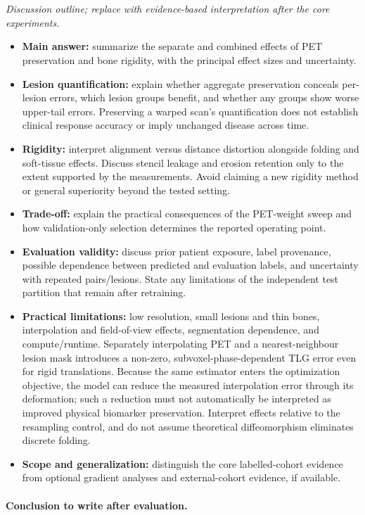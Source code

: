 \section{}
\begin{journaladdition}
\noindent\textit{Discussion outline; replace with evidence-based interpretation after the core experiments.}
\begin{itemize}
  \item \textbf{Main answer:} summarize the separate and combined effects of PET preservation and bone rigidity, with the principal effect sizes and uncertainty.
  \item \textbf{Lesion quantification:} explain whether aggregate preservation conceals per-lesion errors, which lesion groups benefit, and whether any groups show worse upper-tail errors. Preserving a warped scan's quantification does not establish clinical response accuracy or imply unchanged disease across time.
  \item \textbf{Rigidity:} interpret alignment versus distance distortion alongside folding and soft-tissue effects. Discuss stencil leakage and erosion retention only to the extent supported by the measurements. Avoid claiming a new rigidity method or general superiority beyond the tested setting.
  \item \textbf{Trade-off:} explain the practical consequences of the PET-weight sweep and how validation-only selection determines the reported operating point.
  \item \textbf{Evaluation validity:} discuss prior patient exposure, label provenance, possible dependence between predicted and evaluation labels, and uncertainty with repeated pairs/lesions. State any limitations of the independent test partition that remain after retraining.
  \item \textbf{Practical limitations:} low resolution, small lesions and thin bones, interpolation and field-of-view effects, segmentation dependence, and compute/runtime. Separately interpolating PET and a nearest-neighbour lesion mask introduces a non-zero, subvoxel-phase-dependent TLG error even for rigid translations. Because the same estimator enters the optimization objective, the model can reduce the measured interpolation error through its deformation; such a reduction must not automatically be interpreted as improved physical biomarker preservation. Interpret effects relative to the resampling control, and do not assume theoretical diffeomorphism eliminates discrete folding.
  \item \textbf{Scope and generalization:} distinguish the core labelled-cohort evidence from optional gradient analyses and external-cohort evidence, if available.
\end{itemize}
\paragraph{Conclusion to write after evaluation.}
\end{journaladdition}
